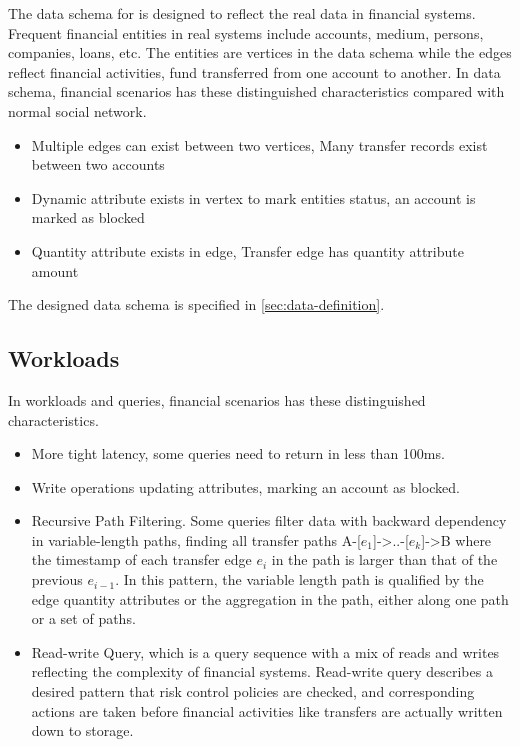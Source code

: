 The data schema for \ldbcfinbench is designed to reflect the real data in financial systems. Frequent
financial entities in real systems include accounts, medium, persons, companies, loans, etc. The
entities are vertices in the data schema while the edges reflect financial activities, \eg fund transferred
from one account to another. In data schema, financial scenarios has these distinguished characteristics
compared with normal social network.
\begin{itemize}
    \item Multiple edges can exist between two vertices, \eg Many transfer records exist between two accounts
    \item Dynamic attribute exists in vertex to mark entities status, \eg an account is marked as blocked
    \item Quantity attribute exists in edge, \eg Transfer edge has quantity attribute amount
\end{itemize}

The designed data schema is specified in \autoref{sec:data-definition}.

\subsection{Workloads}

In workloads and queries, financial scenarios has these distinguished characteristics.
\begin{itemize}
    \item More tight latency, \eg some queries need to return in less than 100ms.
    \item Write operations updating attributes, \eg marking an account as blocked.
    \item Recursive Path Filtering. Some queries filter data with backward dependency
          in variable-length paths, \eg finding all transfer paths A-[${e_1}$]->..-[${e_k}$]->B
          where the timestamp of each transfer edge ${e_i}$ in the path is larger than that of
          the previous ${e_{i-1}}$. In this pattern, the variable length path is qualified by
          the edge quantity attributes or the aggregation in the path, either along one path
          or a set of paths.
    \item Read-write Query, which is a query sequence with a mix of reads and writes reflecting the
          complexity of financial systems. Read-write query describes a desired pattern that risk control
          policies are checked, and corresponding actions are taken before financial activities like
          transfers are actually written down to storage.
\end{itemize}

